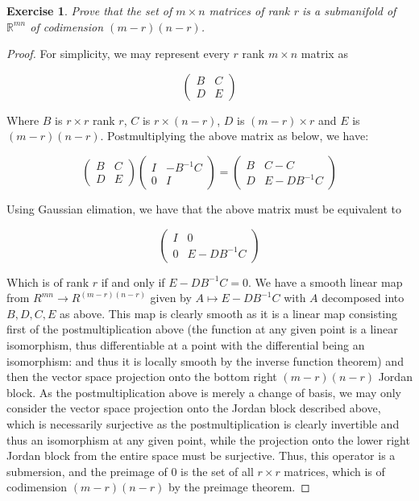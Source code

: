 \documentclass{article}
\newtheorem{exercise}{Exercise}
\begin{document}
\begin{exercise}
  Prove that the set of $m \times n$ matrices of rank r is a submanifold of $\mathbb{R}^{mn}$ of codimension $(m-r)(n-r)$. 
  \end{exercise}
  \begin{proof}
    For simplicity, we may represent every $r$ rank $m\times n$ matrix as

    \[
      \begin{pmatrix} B & C \\ D & E \end{pmatrix}
    \]

    Where $B$ is $r\times r$ rank $r$, $C$ is $r \times (n -r)$, $D$ is $(m-r) \times r$ and $E$ is $(m-r)(n-r)$. Postmultiplying the above matrix as below, we have:

    \[
      \begin{pmatrix} B & C \\ D & E \end{pmatrix} \begin{pmatrix} I & -B^{-1}C \\ 0 & I \end{pmatrix} =  \begin{pmatrix} B & C - C \\ D & E - DB^{-1}C \end{pmatrix}
    \]

    Using Gaussian elimation, we have that the above matrix must be equivalent to

    \[
 \begin{pmatrix} I & 0 \\ 0 & E - DB^{-1}C \end{pmatrix}
\]

Which is of rank $r$ if and only if $E - DB^{-1}C = 0$. We have a smooth linear map from $R^{mn} \to R^{(m-r)(n-r)}$ given by $A \mapsto E - DB^{-1}C$ with $A$ decomposed into $B, D, C, E$ as above. This map is clearly smooth as it is a linear map consisting first of the postmultiplication above (the function at any given point is a linear isomorphism, thus differentiable at a point with the differential being an isomorphism: and thus it is locally smooth by the inverse function theorem) and then the vector space projection onto the bottom right $(m-r)(n-r)$ Jordan block. As the postmultiplication above is merely a change of basis, we may only consider the vector space projection onto the Jordan block described above, which is necessarily surjective as the postmultiplication is clearly invertible and thus an isomorphism at any given point, while the projection onto the lower right Jordan block from the entire space must be surjective. Thus, this operator is a submersion, and the preimage of $0$ is the set of all $r \times r$ matrices, which is of codimension $(m-r)(n-r)$ by the preimage theorem. 
    \end{proof}
\end{document}
